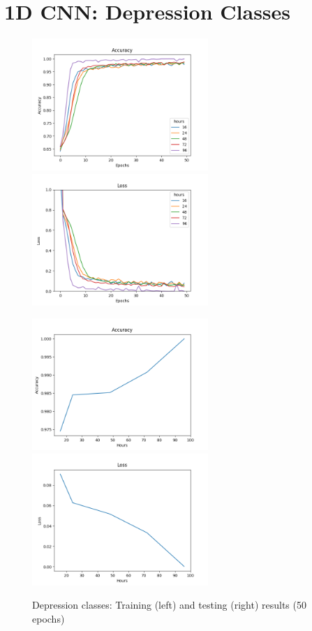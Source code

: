 \section{1D CNN: Depression Classes}

\begin{figure}
      \begin{multicols}{2}
            \includegraphics[height=5cm]{img/depression_class/plot_acc_train.png}
            \includegraphics[height=5cm]{img/depression_class/plot_loss_train.png}

            \includegraphics[height=5cm]{img/depression_class/plot_acc_eval.png}
            \includegraphics[height=5cm]{img/depression_class/plot_loss_eval.png}
      \end{multicols}
      \caption{Depression classes: Training (left) and testing (right) results (50 epochs)}
      \label{figure:depression_class_50e}
\end{figure}

